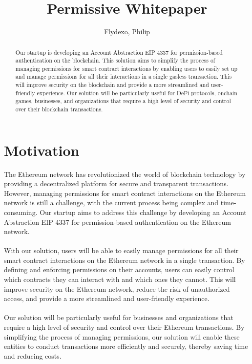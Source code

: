 \documentclass{article}
\title{Permissive Whitepaper}
\author{Flydexo, Philip}
\begin{document}
\maketitle
\begin{abstract}
    Our startup is developing an Account Abstraction EIP 4337 for permission-based authentication on the blockchain. This solution aims to simplify the process of managing permissions for smart contract interactions by enabling users to easily set up and manage permissions for all their interactions in a single gasless transaction. This will improve security on the blockchain and provide a more streamlined and user-friendly experience. Our solution will be particularly useful for DeFi protocols, onchain games, businesses, and organizations that require a high level of security and control over their blockchain transactions.
\end{abstract}
\tableofcontents
\section{Motivation}
\paragraph{}
The Ethereum network has revolutionized the world of blockchain technology by providing a decentralized platform for secure and transparent transactions. However, managing permissions for smart contract interactions on the Ethereum network is still a challenge, with the current process being complex and time-consuming. Our startup aims to address this challenge by developing an Account Abstraction EIP 4337 for permission-based authentication on the Ethereum network.
\paragraph{}
With our solution, users will be able to easily manage permissions for all their smart contract interactions on the Ethereum network in a single transaction. By defining and enforcing permissions on their accounts, users can easily control which contracts they can interact with and which ones they cannot. This will improve security on the Ethereum network, reduce the risk of unauthorized access, and provide a more streamlined and user-friendly experience.
\paragraph{}
Our solution will be particularly useful for businesses and organizations that require a high level of security and control over their Ethereum transactions. By simplifying the process of managing permissions, our solution will enable these entities to conduct transactions more efficiently and securely, thereby saving time and reducing costs.
\end{document}
